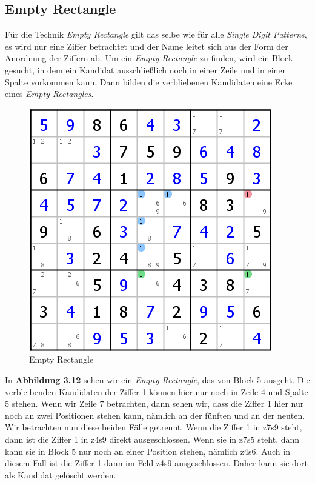 \documentclass[accentcolor=tud6b,11pt,paper=a4]{tudreport}
\begin{document}
\newpage
\subsection{Empty Rectangle}
Für die Technik \textit{Empty Rectangle} gilt das selbe wie für alle \textit{Single Digit Patterns}, es wird nur eine Ziffer betrachtet und der Name leitet sich aus der Form der Anordnung der Ziffern ab. Um ein \textit{Empty Rectangle} zu finden, wird ein Block gesucht, in dem ein Kandidat ausschließlich noch in einer Zeile und in einer Spalte vorkommen kann. Dann bilden die verbliebenen Kandidaten eine Ecke eines \textit{Empty Rectangles}.

\begin{figure}[h]
\begin{center}
\includegraphics{./img/empty_rectangle.png}
\caption{Empty Rectangle}
\end{center}
\end{figure}

In \textbf{Abbildung 3.12} sehen wir ein \textit{Empty Rectangle}, das von Block 5 ausgeht. Die verbleibenden Kandidaten der Ziffer 1 können hier nur noch in Zeile 4 und Spalte 5 stehen. Wenn wir Zeile 7 betrachten, dann sehen wir, dass die Ziffer 1 hier nur noch an zwei Positionen stehen kann, nämlich an der fünften und an der neuten. Wir betrachten nun diese beiden Fälle getrennt. Wenn die Ziffer 1 in z7s9 steht, dann ist die Ziffer 1 in z4s9 direkt ausgeschlossen. Wenn sie in z7s5 steht, dann kann sie in Block 5 nur noch an einer Position stehen, nämlich z4s6. Auch in diesem Fall ist die Ziffer 1 dann im Feld z4s9 ausgeschlossen. Daher kann sie dort als Kandidat gelöscht werden.
\newpage
\end{document}
